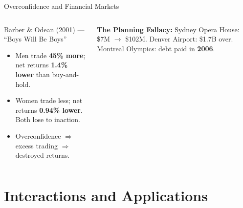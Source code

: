 \documentclass[aspectratio=169]{beamer}
\begin{document}
\begin{frame}{Overconfidence and Financial Markets}
\begin{columns}
\begin{alertblock}{Barber \& Odean (2001) --- ``Boys Will Be Boys''}
\begin{itemize}\small
  \item Men trade \textbf{45\% more}; net returns \textbf{1.4\% lower} than buy-and-hold.
  \item Women trade less; net returns \textbf{0.94\% lower}. Both lose to inaction.
  \item Overconfidence $\Rightarrow$ excess trading $\Rightarrow$ destroyed returns.
\end{itemize}
\end{alertblock}
\textcolor{beblue}{\textbf{The Planning Fallacy:}} Sydney Opera House: \$7M $\to$ \$102M. Denver Airport: \$1.7B over. Montreal Olympics: debt paid in \textbf{2006}.
\end{columns}
\end{frame}

\section{Interactions and Applications}
\end{document}
